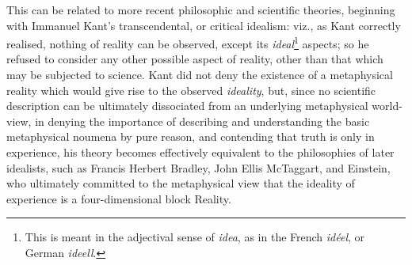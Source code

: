 This can be related to more recent philosophic and scientific theories, beginning with Immanuel Kant's transcendental, or critical idealism: viz., as Kant correctly realised, nothing of reality can be observed, except its \textit{ideal}\footnote{This is meant in the adjectival sense of \textit{idea}, as in the French \textit{id\'{e}el}, or German \textit{ideell}.} aspects; so he refused to consider any other possible aspect of reality, other than that which may be subjected to science. Kant did not deny the existence of a metaphysical reality which would give rise to the observed \textit{ideality}, but, since no scientific description can be ultimately dissociated from an underlying metaphysical world-view, in denying the importance of describing and understanding the basic metaphysical noumena by pure reason, and contending that truth is only in experience, his theory becomes effectively equivalent to the philosophies of later idealists, such as Francis Herbert Bradley, John Ellis McTaggart, and Einstein, who ultimately committed to the metaphysical view that the ideality of experience is a four-dimensional block Reality.


